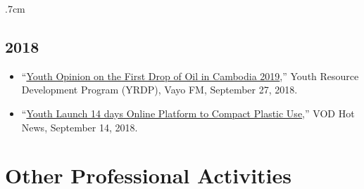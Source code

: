 \documentclass[10pt,a4paper]{article}
\begin{document}
\begin{adjustwidth}{.7cm}{}
	\subsection*{2018}
		\begin{itemize}[label={},itemindent=-2em,leftmargin=2em]

			\item “\href{https://www.facebook.com/yrdpcambodiapage/videos/2148807268711599}{Youth Opinion on the First Drop of Oil in Cambodia 2019},” Youth Resource Development Program (YRDP), Vayo FM, September 27, 2018. 
								
			\item “\href{https://vodkhmer.news/2018/09/14/youth-luanch-14-days-online-platform-to-compat-plastic-use/}{Youth Launch 14 days Online Platform to Compact Plastic Use},” VOD Hot News, September 14, 2018.		
			
		\end{itemize}
									
	\end{adjustwidth}		
	\vspace{-1em}
\section*{Other Professional Activities}
							
\end{document}
